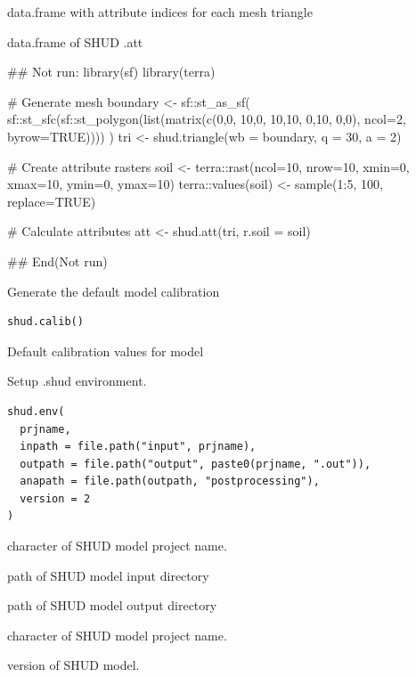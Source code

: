 \documentclass[a4paper]{book}
\begin{document}
%
\begin{Value}
data.frame with attribute indices for each mesh triangle

data.frame of SHUD .att
\end{Value}
%
\begin{Examples}
\begin{ExampleCode}
## Not run: 
library(sf)
library(terra)

# Generate mesh
boundary <- sf::st_as_sf(
  sf::st_sfc(sf::st_polygon(list(matrix(c(0,0, 10,0, 10,10, 0,10, 0,0),
                                         ncol=2, byrow=TRUE))))
)
tri <- shud.triangle(wb = boundary, q = 30, a = 2)

# Create attribute rasters
soil <- terra::rast(ncol=10, nrow=10, xmin=0, xmax=10, ymin=0, ymax=10)
terra::values(soil) <- sample(1:5, 100, replace=TRUE)

# Calculate attributes
att <- shud.att(tri, r.soil = soil)

## End(Not run)
\end{ExampleCode}
\end{Examples}
%
\begin{Description}\relax
Generate the default model calibration
\end{Description}
%
\begin{Usage}
\begin{verbatim}
shud.calib()
\end{verbatim}
\end{Usage}
%
\begin{Value}
Default calibration values for model
\end{Value}
%
\begin{Description}\relax
Setup .shud environment.
\end{Description}
%
\begin{Usage}
\begin{verbatim}
shud.env(
  prjname,
  inpath = file.path("input", prjname),
  outpath = file.path("output", paste0(prjname, ".out")),
  anapath = file.path(outpath, "postprocessing"),
  version = 2
)
\end{verbatim}
\end{Usage}
%
\begin{Arguments}
\begin{ldescription}
\item[\code{prjname}] character of SHUD model project name.

\item[\code{inpath}] path of SHUD model input directory

\item[\code{outpath}] path of SHUD model output directory

\item[\code{anapath}] character of SHUD model project name.

\item[\code{version}] version of SHUD model.
\end{ldescription}
\end{Arguments}
\end{document}
